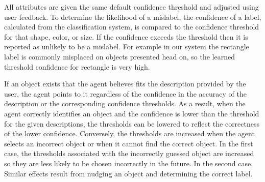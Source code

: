 \documentclass[11pt]{article}
\begin{document}
All attributes are given the same default confidence threshold and adjusted
using user feedback. To determine the likelihood of a mislabel, the confidence
of a label, calculated from the classification system, is compared to the
confidence threshold for that shape, color, or size. If the confidence exceeds
the threshold then it is reported as unlikely to be a mislabel.  For example in
our system the rectangle label is commonly misplaced on objects presented head
on, so the learned threshold confidence for rectangle is very high.

If an object exists that the agent believes fits the description provided by the
user, the agent points to it regardless of the confidence in the accuracy of the
description or the corresponding confidence thresholds. As a result, when the
agent correctly identifies an object and the confidence is lower than the
threshold for the given descriptions, the thresholds can be lowered to reflect
the correctness of the lower confidence. Conversely, the thresholds are increased
when the agent selects an incorrect object or when it cannot find the correct
object. In the first case, the thresholds associated with the incorrectly guessed
object are increased so they are less likely to be chosen incorrectly in the
future. In the second case,
Similar effects result from nudging an object and determining the correct label.
\end{document}
